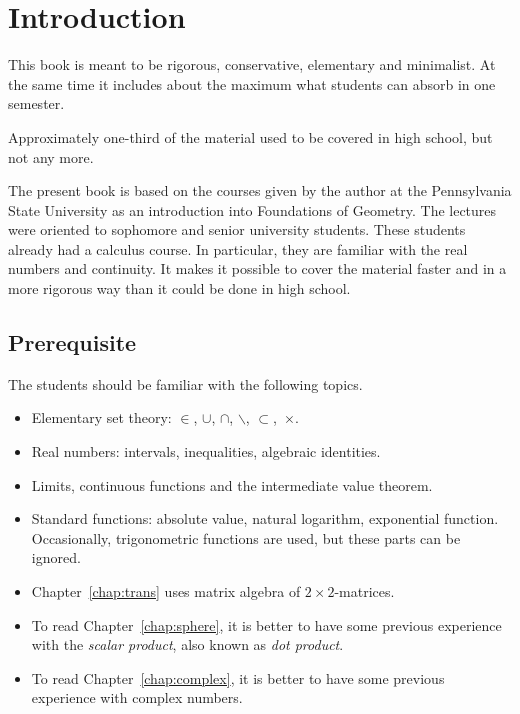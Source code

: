 \chapter*{Introduction}

This book is meant to be 
rigorous, 
conservative, 
elementary and
minimalist.
At the same time it includes about the maximum what students can absorb in one semester.

Approximately one-third of the material used to be covered in high school, but not any more.

The present book is based 
on the courses given by the author 
at the Pennsylvania State University
as an introduction into Foundations of Geometry.
The lectures were oriented to sophomore and senior university students.  
These students already had a calculus course.
In particular, they are familiar with the real numbers and continuity.
It makes it possible to cover the material faster 
and  in a more rigorous way
than it could be done in high school.

\section*{Prerequisite}

The students should be familiar 
with the following topics.
\begin{itemize}
\item Elementary set theory: 
$\in$,
$\cup$, 
$\cap$,
$\backslash$,
$\subset$,~$\times$.
\item Real numbers: intervals, inequalities, algebraic identities.
\item Limits, continuous functions and the intermediate value theorem.
\item Standard functions: 
absolute value, 
natural logarithm,
exponential function. 
Occasionally, trigonometric functions  are used, 
but these parts can be ignored.
\item  Chapter~\ref{chap:trans} uses matrix algebra of $2{\times}2$-matrices.
\item To read Chapter~\ref{chap:sphere}, it is better to have some previous experience with the {}\emph{scalar product}, also known as {}\emph{dot product}.
\item To read Chapter~\ref{chap:complex}, it is better to have some previous experience with complex numbers.
\end{itemize} 

